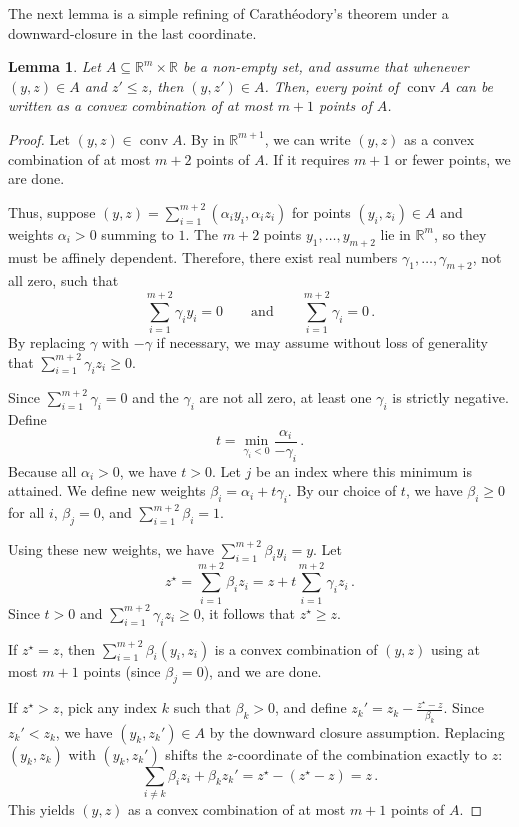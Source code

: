 \documentclass[10pt, a4paper]{article}
\newcommand{\R}{\mathbb R}
\DeclareMathOperator{\conv}{conv}
\newtheorem{lemma}{Lemma}
\begin{document}
The next lemma  is a simple refining of Carathéodory's theorem under a downward-closure in the last coordinate.
\begin{lemma}\label{lemma:caradown}
    Let $A\subseteq\R^m\times\R$ be a non-empty set, and assume that whenever $(y,z)\in A$ and $z'\leq z$, then $(y,z')\in A$. Then, every point of $\conv A$ can be written as a convex combination of at most $m+1$ points of $A$.
\end{lemma}
\begin{proof}
    Let $(y,z)\in\conv A$. By  in $\R^{m+1}$, we can write $(y,z)$ as a convex combination of at most $m+2$ points of $A$. If it requires $m+1$ or fewer points, we are done. 
    
    Thus, suppose $(y,z)=\sum_{i=1}^{m+2}(\alpha_i y_i,\alpha_i z_i)$ for points $(y_i,z_i)\in A$ and weights $\alpha_i>0$ summing to $1$. The $m+2$ points $y_1,\dots,y_{m+2}$ lie in $\R^m$, so they must be affinely dependent. Therefore, there exist real numbers $\gamma_1,\dots,\gamma_{m+2}$, not all zero, such that
    $$\sum_{i=1}^{m+2}\gamma_i y_i = 0 \qquad \text{and} \qquad \sum_{i=1}^{m+2}\gamma_i = 0\,.$$
    By replacing $\gamma$ with $-\gamma$ if necessary, we may assume without loss of generality that $\sum_{i=1}^{m+2}\gamma_i z_i \geq 0$. 
    
    Since $\sum_{i=1}^{m+2}\gamma_i=0$ and the $\gamma_i$ are not all zero, at least one $\gamma_i$ is strictly negative. Define
    $$t = \min_{\gamma_i < 0} \frac{\alpha_i}{-\gamma_i}\,.$$
    Because all $\alpha_i>0$, we have $t>0$. Let $j$ be an index where this minimum is attained. We define new weights $\beta_i = \alpha_i + t\gamma_i$. By our choice of $t$, we have $\beta_i \geq 0$ for all $i$, $\beta_j = 0$, and $\sum_{i=1}^{m+2}\beta_i = 1$. 
    
    Using these new weights, we have $\sum_{i=1}^{m+2}\beta_i y_i = y $. Let
    $$z^\star = \sum_{i=1}^{m+2}\beta_i z_i = z + t\sum_{i=1}^{m+2}\gamma_i z_i\,.$$
    Since $t>0$ and $\sum_{i=1}^{m+2}\gamma_i z_i \geq 0$, it follows that $z^\star \geq z$. 
    
    If $z^\star=z$, then $\sum_{i=1}^{m+2}\beta_i(y_i,z_i)$ is a convex combination of $(y,z)$ using at most $m+1$ points (since $\beta_j=0$), and we are done.
    
    If $z^\star>z$, pick any index $k$ such that $\beta_k>0$, and define $z_k' = z_k - \frac{z^\star-z}{\beta_k}$. Since $z_k'<z_k$, we have $(y_k,z_k')\in A$ by the downward closure assumption. Replacing $(y_k,z_k)$ with $(y_k,z_k')$ shifts the $z$-coordinate of the combination exactly to $z$:
    $$\sum_{i\neq k}\beta_i z_i + \beta_k z_k' = z^\star - (z^\star-z) = z\,.$$
    This yields $(y,z)$ as a convex combination of at most $m+1$ points of $A$.
\end{proof}
\end{document}
